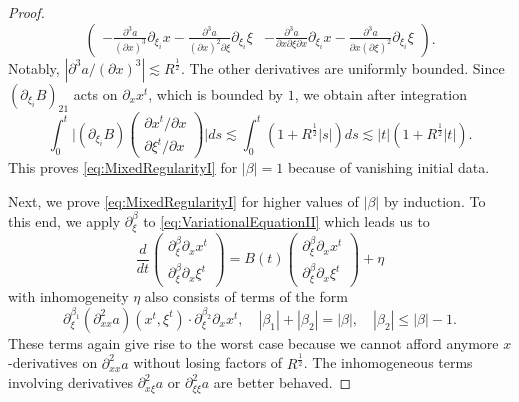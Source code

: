 \documentclass{amsart}
\theoremstyle{definition}
\begin{document}
\begin{proof}
\begin{equation*}
\begin{pmatrix}
- \frac{\partial^3 a}{(\partial x)^3} \partial_{\xi_i} x - \frac{\partial^3 a}{(\partial x)^2 \partial \xi} \partial_{\xi_i} \xi & - \frac{\partial^3 a}{\partial x \partial \xi \partial x} \partial_{\xi_i} x - \frac{\partial^3 a}{\partial x (\partial \xi)^2} \partial_{\xi_i} \xi
\end{pmatrix}
.
\end{equation*}
Notably, $|\partial^3 a / (\partial x)^3| \lesssim R^{\frac{1}{2}}$. The other derivatives are uniformly bounded. Since $(\partial_{\xi_i} B)_{21}$ acts on $\partial_x x^t$, which is bounded by $1$, we obtain after integration
\begin{equation*}
\int_0^t \big| ( \partial_{\xi_i} B) \begin{pmatrix}
\partial x^t / \partial x \\ \partial \xi^t / \partial x
\end{pmatrix} \big| ds \lesssim \int_0^t (1+ R^{\frac{1}{2}}|s|) ds \lesssim |t| (1+ R^{\frac{1}{2}} |t|).
\end{equation*}
This proves \eqref{eq:MixedRegularityI} for $|\beta| = 1$ because of vanishing initial data.

Next, we prove \eqref{eq:MixedRegularityI} for higher values of $|\beta|$ by induction. To this end, we apply $\partial_{\xi}^{\beta}$ to \eqref{eq:VariationalEquationII} which leads us to
\begin{equation*}
\frac{d}{dt} \begin{pmatrix}
\partial_{\xi}^{\beta} \partial_x  x^t \\ \partial_{\xi}^{\beta} \partial_x \xi^t
\end{pmatrix}
= B(t) 
\begin{pmatrix}
\partial_{\xi}^{\beta} \partial_x x^t \\ \partial_{\xi}^{\beta} \partial_x \xi^t
\end{pmatrix}
+ \eta
\end{equation*}
with inhomogeneity $\eta$ also consists of terms of the form
\begin{equation*}
\partial_{\xi}^{\beta_1} (\partial^2_{xx} a)(x^t, \xi^t) \cdot \partial_{\xi}^{\beta_2} \partial_x x^t, \quad |\beta_1| + |\beta_2| = |\beta|, \quad |\beta_2| \leq |\beta|-1.
\end{equation*}
These terms again give rise to the worst case because we cannot afford anymore $x$-derivatives on $\partial^2_{xx} a$ without losing factors of $R^{\frac{1}{2}}$. The inhomogeneous terms involving derivatives $\partial^2_{x \xi} a$ or $\partial^2_{\xi \xi} a$ are better behaved.


\end{proof}
\end{document}
